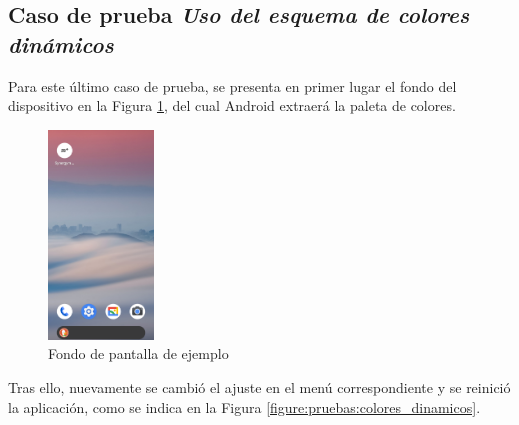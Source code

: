         \subsection*{Caso de prueba \textit{Uso del esquema de colores dinámicos}}

            Para este último caso de prueba, se presenta en primer lugar el fondo del dispositivo en la Figura \ref{figure:pruebas:colores_dinamicos:inicio}, del cual Android extraerá la paleta de colores.

            \begin{figure}[h]
                \centering
                \includegraphics[width=0.25\textwidth]{figures/pruebas/colores_dinamicos/Inicio.png}
                \caption{Fondo de pantalla de ejemplo}
                \label{figure:pruebas:colores_dinamicos:inicio}
            \end{figure}

            Tras ello, nuevamente se cambió el ajuste en el menú correspondiente y se reinició la aplicación, como se indica en la Figura \ref{figure:pruebas:colores_dinamicos}.

